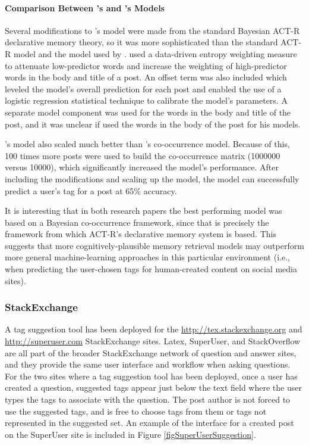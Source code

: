 \documentclass[man,floatsintext,donotrepeattitle]{apa6}
\begin{document}
\paragraph{Comparison Between \citeauthor{Kuo2011}'s and \citeauthor{Stanley2013}'s Models}

Several modifications to \textcite{Stanley2013}'s model were made from the standard Bayesian ACT-R declarative memory theory,
so it was more sophisticated than the standard ACT-R model and the model used by \textcite{Kuo2011}.
\citeauthor{Stanley2013} used a data-driven entropy weighting measure to attenuate low-predictor words and increase the weighting of high-predictor words in the body and title of a post.
An offset term was also included which leveled the model's overall prediction for each post and enabled the use of a logistic regression statistical technique to calibrate the model's parameters.
A separate model component was used for the words in the body and title of the post, and it was unclear if \citeauthor{Kuo2011} used the words in the body of the post for his models.

\citeauthor{Stanley2013}'s model also scaled much better than \citeauthor{Kuo2011}'s co-occurrence model. 
Because of this, 100 times more posts were used to build the co-occurrence matrix (\num{1000000} versus \num{10000}), which significantly increased the model's performance.
After including the modifications and scaling up the model, the model can successfully predict a user's tag for a post at 65\% accuracy.

It is interesting that in both research papers the best performing model was based on a Bayesian co-occurrence framework, since that is precisely the framework from which ACT-R's declarative memory system is based.
This suggests that more cognitively-plausible memory retrieval models may outperform more general machine-learning approaches in this particular environment
(i.e., when predicting the user-chosen tags for human-created content on social media sites).

\subsubsection{StackExchange}

A tag suggestion tool has been deployed for the \url{http://tex.stackexchange.org} \parencite{LatexTags2013} and \url{http://superuser.com} \parencite{SuperUserTags2013} StackExchange sites.
Latex, SuperUser, and StackOverflow are all part of the broader StackExchange network of question and answer sites, and they provide the same user interface and workflow when asking questions.
For the two sites where a tag suggestion tool has been deployed, once a user has created a question, suggested tags appear just below the text field where the user types the tags to associate with the question.
The post author is not forced to use the suggested tags, and is free to choose tags from them or tags not represented in the suggested set.
An example of the interface for a created post on the SuperUser site is included in Figure \ref{figSuperUserSuggestion}.
\end{document}
